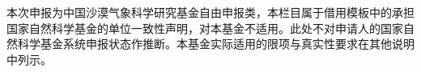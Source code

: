 \justifying
\NSFCBodyText

本次申报为中国沙漠气象科学研究基金自由申报类，本栏目属于借用模板中的承担国家自然科学基金的单位一致性声明，对本基金不适用。此处不对申请人的国家自然科学基金系统申报状态作推断。本基金实际适用的限项与真实性要求在其他说明中列示。
